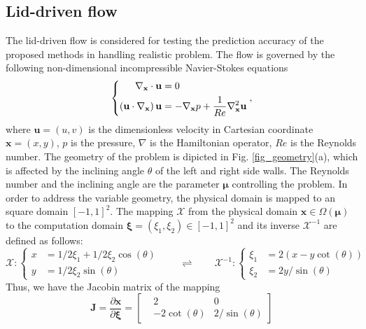 \documentclass[preprint, 10pt]{elsarticle}
\begin{document}
\subsection{Lid-driven flow}
The lid-driven flow is considered for testing the prediction accuracy of the proposed methods in handling realistic problem.
The flow is governed by the following non-dimensional incompressible Navier-Stokes equations
\begin{equation}
\left \{
\begin{aligned}
\nabla_{\mathbf{x}}  \cdot {\bf{u}} &= 0 \\
\left( {{\bf{u}} \cdot \nabla_{\mathbf{x}} } \right){\bf{u}} &=  - \nabla_{\mathbf{x}} p + \frac{1}{Re}{\nabla_{\mathbf{x}} ^2}{\bf{u}}
\end{aligned}
\right .
,
\label{eq_GoverningEqsLidDriven}
\end{equation}
where $\mathbf{u}=(u,v)$ is the dimensionless velocity in Cartesian coordinate $\mathbf{x}=(x,y)$, $p$ is the pressure, $\nabla$ is the  Hamiltonian operator, $Re$ is the Reynolds number.  The geometry of the problem is dipicted in Fig. \ref{fig_geometry}(a), which is affected by  the inclining angle $\theta$ of the left and right side walls. The Reynolds number and the inclining angle are the parameter $\pmb {\mu} $ controlling the problem. In order to address the variable geometry, the physical domain  is mapped to an square domain $[-1,1]^2$. The mapping $\mathcal{X}$ from the physical domain $\mathbf{x} \in \Omega\left(\pmb{\mu}\right)$ to the computation domain $\pmb{ \xi}=(\xi_1, \xi_2) \in [-1,1]^2$  and its inverse $\mathcal{X}^{-1}$ are defined as follows:
\begin{equation}
\mathcal{X}:
\left \{
\begin{aligned}
x &= 1/2 \xi_1 + 1/2 \xi_2 \cos(\theta)\\
y &= 1/2 \xi_2 \sin(\theta)
\end{aligned}
\right .
\qquad
\rightleftharpoons
\qquad
\mathcal{X}^{-1}:
\left \{
\begin{aligned}
\xi_1 &= 2(x-y \cot(\theta))\\
\xi_2 &= 2y/\sin(\theta)
\end{aligned}
\right .
\end{equation}
Thus, we have the Jacobin matrix of the mapping
\begin{equation}
\mathbf{J} = \frac{\partial \mathbf{x}}{\partial \pmb{\xi}}
           =
\begin{bmatrix}
 &2             & 0\\
 &-2\cot(\theta)&2/\sin(\theta)
\end{bmatrix}
\label{eq_JacLidDriven}
\end{equation}
\end{document}
